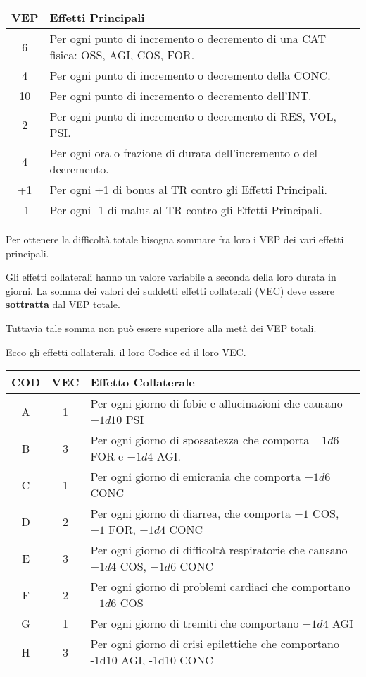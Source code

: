 \begin{center}

\begin{tabular}{|c|p{4 cm}|}
\hline
  VEP& Effetti Principali \\ \hline\hline
  6& \raggedright Per ogni punto di incremento o decremento di una CAT
  fisica: OSS, AGI, COS, FOR. \tabularnewline \hline
  4& \raggedright Per ogni punto di incremento o decremento della
  CONC. \tabularnewline \hline
  10& \raggedright Per ogni punto di incremento o decremento dell'INT. \tabularnewline \hline
  2& \raggedright Per ogni punto di incremento o decremento di RES, VOL, PSI. \tabularnewline \hline
  4& \raggedright Per ogni ora o frazione di durata dell'incremento o del decremento. \tabularnewline \hline
  +1& \raggedright Per ogni +1 di bonus al TR contro gli Effetti Principali. \tabularnewline \hline
  -1& \raggedright Per ogni -1 di malus al TR contro gli Effetti Principali. \tabularnewline \hline
\end{tabular}
\end{center}

Per ottenere la difficolt\`a totale bisogna sommare fra loro i VEP dei
vari effetti principali.


Gli effetti collaterali hanno un valore variabile a seconda della loro
durata in giorni. La somma dei valori dei suddetti effetti collaterali
(VEC) deve essere \textbf{sottratta} dal VEP totale.

Tuttavia tale somma non pu\`o essere superiore alla met\`a dei VEP
totali.

Ecco gli effetti collaterali, il loro Codice ed il loro VEC.
\begin{center}
  \begin{tabular}{|c|c|p{4cm}|}
    \hline
    COD& VEC& Effetto Collaterale \\ \hline\hline
    A& 1& \raggedright Per ogni giorno di fobie e allucinazioni che causano $-1d10$ PSI \tabularnewline \hline
    B& 3& \raggedright Per ogni giorno di spossatezza che comporta $-1d6$ FOR e $-1d4$ AGI.  \tabularnewline \hline
    C& 1& \raggedright Per ogni giorno di emicrania che comporta $-1d6$ CONC  \tabularnewline \hline
    D& 2& \raggedright Per ogni giorno di diarrea, che comporta $-1$ COS, $-1$ FOR, $-1d4$ CONC  \tabularnewline \hline
    E& 3& \raggedright Per ogni giorno di difficolt\`a respiratorie che causano $-1d4$ COS, $-1d6$ CONC  \tabularnewline \hline
    F& 2& \raggedright Per ogni giorno di problemi cardiaci che comportano $-1d6$ COS \tabularnewline \hline
    G& 1& \raggedright Per ogni giorno di tremiti che comportano $-1d4$ AGI  \tabularnewline \hline
    H& 3& \raggedright Per ogni giorno di crisi epilettiche che
    comportano -1d10 AGI, -1d10 CONC  \tabularnewline \hline
  \end{tabular}
\end{center}

